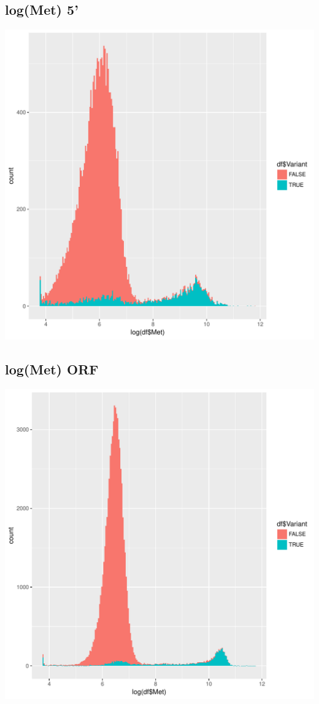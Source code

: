 \documentclass{article}\usepackage[]{graphicx}\usepackage[]{color}
\newenvironment{knitrout}{}{} %
\begin{document}
\subsection{log(Met) 5'}
\begin{knitrout}
\color{fgcolor}
\includegraphics[width=1\linewidth]{figure/dens_5_met-1} 

\end{knitrout}
\clearpage
\subsection{log(Met) ORF}
\begin{knitrout}
\color{fgcolor}
\includegraphics[width=1\linewidth]{figure/dens_ORF_met-1} 

\end{knitrout}
\clearpage
\end{document}

